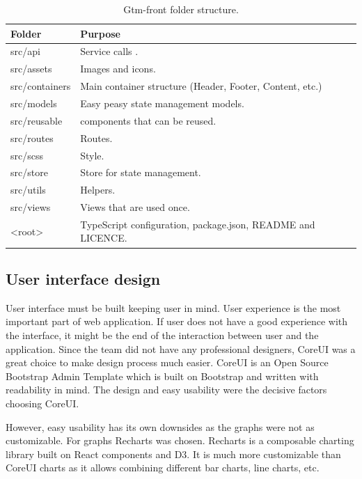 \begin{table}[h]
    \centering
    \begin{tabular}{ | p{3cm} | p{10cm} |}
        \hline
        Folder & Purpose\\
        \hline
        src/api & Service calls .\\
        \hline
        src/assets & Images and icons. \\
        \hline
        src/containers & Main container structure (Header, Footer, Content, etc.)\\
        \hline
        src/models & Easy peasy state management models.\\
        \hline
        src/reusable & components that can be reused.\\
        \hline
        src/routes & Routes.\\
        \hline
        src/scss & Style.\\
        \hline
        src/store & Store for state management.\\
        \hline
        src/utils & Helpers.\\
        \hline
        src/views & Views that are used once.\\
        \hline
        <root> & TypeScript configuration, package.json, README and LICENCE.\\
        \hline
    \end{tabular}
    \caption{Gtm-front folder structure.}
    \label{tab:gtm-front-folder-structure}
\end{table}

\subsection{User interface design}\label{subsec:user-interface-design}
User interface must be built keeping user in mind.
User experience is the most important part of web application.
If user does not have a good experience with the interface, it might be the end of the interaction between user and the application.
Since the team did not have any professional designers, CoreUI was a great choice to make design process much easier.
CoreUI is an Open Source Bootstrap Admin Template which is built on Bootstrap and written with readability in mind.
The design and easy usability were the decisive factors choosing CoreUI.

However, easy usability has its own downsides as the graphs were not as customizable.
For graphs Recharts was chosen.
Recharts is a composable charting library built on React components and D3.
It is much more customizable than CoreUI charts as it allows combining different bar charts, line charts, etc.
\cite{recharts-readme}

